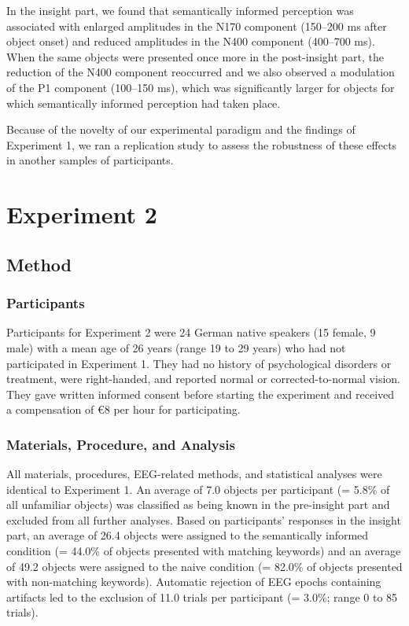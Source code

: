 \documentclass[
  english,
  man,floatsintext]{apa7}
\begin{document}
In the insight part, we found that semantically informed perception was associated with enlarged amplitudes in the N170 component (150--200 ms after object onset) and reduced amplitudes in the N400 component (400--700 ms). When the same objects were presented once more in the post-insight part, the reduction of the N400 component reoccurred and we also observed a modulation of the P1 component (100--150 ms), which was significantly larger for objects for which semantically informed perception had taken place.

Because of the novelty of our experimental paradigm and the findings of Experiment 1, we ran a replication study to assess the robustness of these effects in another samples of participants.

\hypertarget{experiment-2}{%
\section{Experiment 2}\label{experiment-2}}

\hypertarget{method-1}{%
\subsection{Method}\label{method-1}}

\hypertarget{participants-1}{%
\subsubsection{Participants}\label{participants-1}}

Participants for Experiment 2 were 24 German native speakers (15 female, 9 male) with a mean age of 26 years (range 19 to 29 years) who had not participated in Experiment 1. They had no history of psychological disorders or treatment, were right-handed, and reported normal or corrected-to-normal vision. They gave written informed consent before starting the experiment and received a compensation of €8 per hour for participating.

\hypertarget{materials-procedure-and-analysis}{%
\subsubsection{Materials, Procedure, and Analysis}\label{materials-procedure-and-analysis}}

All materials, procedures, EEG-related methods, and statistical analyses were identical to Experiment 1. An average of 7.0 objects per participant (= 5.8\% of all unfamiliar objects) was classified as being known in the pre-insight part and excluded from all further analyses. Based on participants' responses in the insight part, an average of 26.4 objects were assigned to the semantically informed condition (= 44.0\% of objects presented with matching keywords) and an average of 49.2 objects were assigned to the naive condition (= 82.0\% of objects presented with non-matching keywords). Automatic rejection of EEG epochs containing artifacts led to the exclusion of 11.0 trials per participant (= 3.0\%; range 0 to 85 trials).
\end{document}
